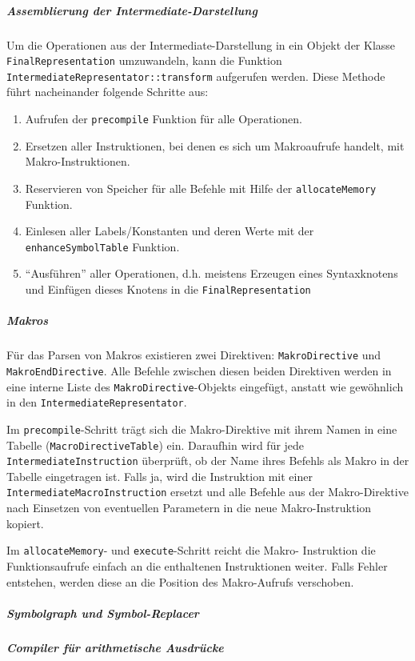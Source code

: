 \subparagraph{Assemblierung der Intermediate-Darstellung}
Um die Operationen aus der Intermediate-Darstellung in ein Objekt der Klasse
\texttt{FinalRepresentation} umzuwandeln, kann die Funktion
\texttt{IntermediateRepresentator::\allowbreak{}transform} aufgerufen werden.
Diese Methode führt nacheinander folgende Schritte aus:

\begin{enumerate}
	\item Aufrufen der \texttt{precompile} Funktion für alle Operationen.
	\item Ersetzen aller Instruktionen, bei denen es sich um Makroaufrufe
	handelt, mit Makro-Instruktionen.
	\item Reservieren von Speicher für alle Befehle mit Hilfe der
	\texttt{allocateMemory} Funktion.
	\item Einlesen aller Labels/Konstanten und deren Werte mit der
	\texttt{enhanceSymbolTable} Funktion.
	\item "`Ausführen"' aller Operationen, d.h. meistens Erzeugen eines
	Syntaxknotens und Einfügen dieses Knotens in die \texttt{FinalRepresentation}
\end{enumerate}

\subparagraph{Makros}
Für das Parsen von Makros existieren zwei Direktiven: \texttt{Makro\-Directive}
und \texttt{Makro\-End\-Directive}. Alle Befehle zwischen diesen beiden
Direktiven werden in eine interne Liste des \texttt{Makro\-Directive}-Objekts
eingefügt, anstatt wie gewöhnlich in den \texttt{Intermediate\-Representator}.

Im \texttt{precompile}-Schritt trägt sich die Makro-Direktive mit ihrem Namen
in eine Tabelle (\texttt{Macro\-Directive\-Table}) ein. Daraufhin wird für jede
\texttt{Intermediate\-Instruction} überprüft, ob der Name ihres Befehls als
Makro in der Tabelle eingetragen ist. Falls ja, wird die Instruktion mit einer
\texttt{Intermediate\-Macro\-Instruction} ersetzt und alle Befehle aus der
Makro-Direktive nach Einsetzen von eventuellen Parametern in die neue
Makro-Instruktion kopiert.

Im \texttt{allocateMemory}- und \texttt{execute}-Schritt reicht die Makro-
Instruktion die Funktionsaufrufe einfach an die enthaltenen Instruktionen
weiter. Falls Fehler entstehen, werden diese an die Position des Makro-Aufrufs
verschoben.

\subparagraph{Symbolgraph und Symbol-Replacer}

\subparagraph{Compiler für arithmetische Ausdrücke}

